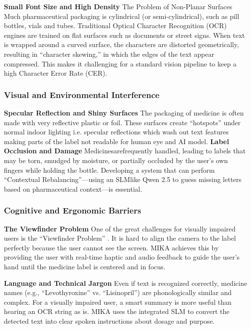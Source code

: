 \documentclass[12pt,a4paper]{report}
\begin{document}
\noindent \textbf{Small Font Size and High Density} The Problem of Non-Planar Surfaces Much pharmaceutical packaging is cylindrical (or semi-cylindrical), such as pill bottles, vials and tubes. Traditional Optical Character Recognition (OCR) engines are trained on flat surfaces such as documents or street signs. When text is wrapped around a curved surface, the characters are distorted geometrically, resulting in “character skewing,” in which the edges of the text appear compressed. This makes it challenging for a standard vision pipeline to keep a high Character Error Rate (CER).

\subsubsection{Visual and Environmental Interference}
 
\noindent \textbf{Specular Reflection and Shiny Surfaces} The packaging of medicine is often made with very reflective plastic or foil. These surfaces create “hotspots” under normal indoor lighting i.e. specular reflections which wash out text features making parts of the label not readable for human eye and AI model. 
\noindent \textbf{Label Occlusion and Damage}
Medicinesarefrequently handled, leading to labels that may be torn, smudged by moisture, or partially occluded by the user’s own fingers while holding the bottle. Developing a system that can perform “Contextual Rebalancing”—using an SLMlike Qwen 2.5 to guess missing letters based on pharmaceutical context—is essential. 

\subsubsection{Cognitive and Ergonomic Barriers}
\textbf{The Viewfinder Problem} One of the great challenges for visually impaired users is the “Viewfinder Problem” . It is hard to align the camera to the label perfectly because the user cannot see the screen. MIKA achieves this by providing the user with real-time haptic and audio feedback to guide the user’s hand until the medicine label is centered and in focus.
 
\noindent \textbf{Language and Technical Jargon} Even if text is recognized correctly, medicine names (e.g., ``Levothyroxine'' vs. ``Lisinopril'') are phonologically similar and complex. For a visually impaired user, a smart summary is more useful than hearing an OCR string as is. MIKA uses the integrated SLM to convert the detected text into clear spoken instructions about dosage and purpose.
\end{document}

